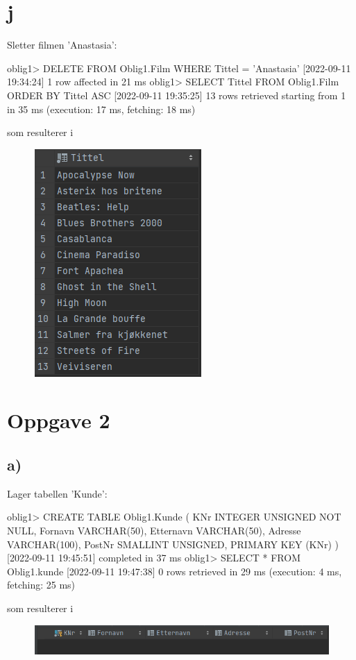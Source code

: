 \documentclass[%
notitlepage,
 amsmath,amssymb,
 aps,
rmp,
]{revtex4-2}  %
\begin{document}
\section*{j}
Sletter filmen 'Anastasia':
\begin{sql}
oblig1> DELETE
        FROM Oblig1.Film
        WHERE Tittel = 'Anastasia'
[2022-09-11 19:34:24] 1 row affected in 21 ms
oblig1> SELECT Tittel
        FROM Oblig1.Film
        ORDER BY Tittel ASC
[2022-09-11 19:35:25] 13 rows retrieved starting from 1 in 35 ms (execution: 17 ms, fetching: 18 ms)
\end{sql}
\newpage
som resulterer i
\begin{figure}[H]
\centering\includegraphics[scale=1]{op1j.png}
\end{figure}

\section*{Oppgave 2}
\subsection*{a)}
Lager tabellen 'Kunde':
\begin{sql}
oblig1> CREATE TABLE Oblig1.Kunde (
            KNr INTEGER UNSIGNED NOT NULL,
            Fornavn VARCHAR(50),
            Etternavn VARCHAR(50),
            Adresse VARCHAR(100),
            PostNr SMALLINT UNSIGNED,
            PRIMARY KEY (KNr)
        )
[2022-09-11 19:45:51] completed in 37 ms
oblig1> SELECT *
        FROM Oblig1.kunde
[2022-09-11 19:47:38] 0 rows retrieved in 29 ms (execution: 4 ms, fetching: 25 ms)
\end{sql}
som resulterer i
\begin{figure}[H]
\centering\includegraphics[scale=1]{op2a.png}
\end{figure}
\end{document}

